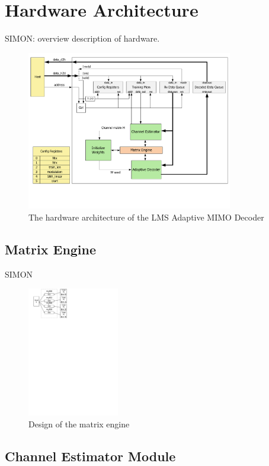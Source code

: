 \documentclass[journal]{IEEEtran}
\begin{document}
\section{Hardware Architecture}

SIMON: overview description of hardware.

\begin{figure}[!h]
\centering
\includegraphics*[width=9cm, viewport = 0 90 789 600]{images/top_level_arch.pdf}
\caption{The hardware architecture of the LMS Adaptive MIMO Decoder}
\label{top_level_arch}
\end{figure}

\subsection{Matrix Engine}

SIMON

\begin{figure}[!h]
\centering
\includegraphics*[width=4cm, viewport = 30 640 260 840]{images/matrix_engine.pdf}
\caption{Design of the matrix engine}
\label{matrix_engine}
\end{figure}

\subsection{Channel Estimator Module}
\end{document}
